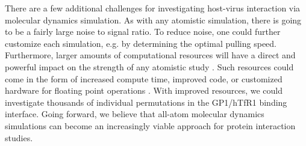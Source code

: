 \documentclass[12pt]{article}
\begin{document}
There are a few additional challenges for investigating host-virus interaction via molecular dynamics simulation. As with any atomistic simulation, there is going to be a fairly large noise to signal ratio. To reduce noise, one could further customize each simulation, e.g. by determining the optimal pulling speed. Furthermore, larger amounts of computational resources will have a direct and powerful impact on the strength of any atomistic study \citep{Shaw2012}. Such resources could come in the form of increased compute time, improved code, or customized hardware for floating point operations \citep{Shaw2011}. With improved resources, we could investigate thousands of individual permutations in the GP1/hTfR1 binding interface. Going forward, we believe that all-atom molecular dynamics simulations can become an increasingly viable approach for protein interaction studies. 

\end{document}
